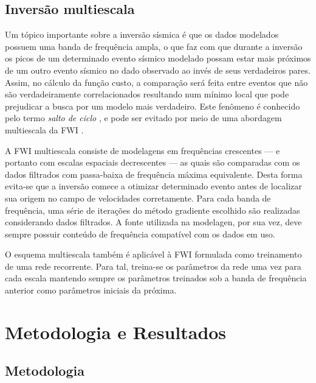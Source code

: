   \section{Inversão multiescala}

    Um tópico importante sobre a inversão sísmica é que os dados modelados possuem uma banda de frequência ampla, o que faz com que durante a inversão os picos de um determinado evento sísmico modelado possam estar mais próximos de um outro evento sísmico no dado observado ao invés de seus verdadeiros pares. Assim, no cálculo da função custo, a comparação será feita entre eventos que não são verdadeiramente correlacionados resultando num mínimo local que pode prejudicar a busca por um modelo mais verdadeiro. Este fenômeno é conhecido pelo termo \emph{salto de ciclo} , e pode ser evitado por meio de uma abordagem multiescala da FWI .

    A FWI multiescala consiste de modelagens em frequências crescentes --- e portanto com escalas espaciais decrescentes --- as quais são comparadas com os dados filtrados com passa-baixa de frequência máxima equivalente. Desta forma evita-se que a inversão comece a otimizar determinado evento antes de localizar sua origem no campo de velocidades corretamente. Para cada banda de frequência, uma série de iterações do método gradiente escolhido são realizadas considerando dados filtrados. A fonte utilizada na modelagen, por sua vez, deve sempre possuir conteúdo de frequência compatível com os dados em uso.

    O esquema multiescala também é aplicável à FWI formulada como treinamento de uma rede recorrente. Para tal, treina-se os parâmetros da rede uma vez para cada escala mantendo sempre os parâmetros treinados sob a banda de frequência anterior como parâmetros iniciais da próxima.

\chapter{Metodologia e Resultados}

  \section{Metodologia}


